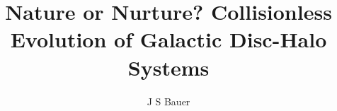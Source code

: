 

%


\newcommand{\zrms}{z_{\rm rms}}
\newcommand{\zeff}{z_{\rm rms,eff}}
\renewcommand{\thepage}{}




\title{Nature or Nurture? Collisionless Evolution of Galactic Disc-Halo Systems}

\author{J S Bauer}



\beforepreface


